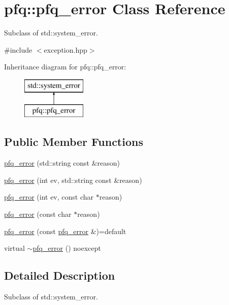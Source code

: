 \hypertarget{classpfq_1_1pfq__error}{}\section{pfq\+:\+:pfq\+\_\+error Class Reference}
\label{classpfq_1_1pfq__error}


Subclass of std\+::system\+\_\+error.  




{\ttfamily \#include $<$exception.\+hpp$>$}

Inheritance diagram for pfq\+:\+:pfq\+\_\+error\+:\begin{figure}[H]
\begin{center}
\leavevmode
\includegraphics[height=2.000000cm]{classpfq_1_1pfq__error}
\end{center}
\end{figure}
\subsection*{Public Member Functions}
\begin{DoxyCompactItemize}
\item 
\hyperlink{classpfq_1_1pfq__error_af30cff741114b46fd4c50cef987d3ac4}{pfq\+\_\+error} (std\+::string const \&reason)
\item 
\hyperlink{classpfq_1_1pfq__error_ad11ae06da6b581f49d40081d51ae4a6b}{pfq\+\_\+error} (int ev, std\+::string const \&reason)
\item 
\hyperlink{classpfq_1_1pfq__error_a200dca27eee04a6da834364b9342a81d}{pfq\+\_\+error} (int ev, const char $\ast$reason)
\item 
\hyperlink{classpfq_1_1pfq__error_a5af35c9d9dea6aceff0672b92ad6b844}{pfq\+\_\+error} (const char $\ast$reason)
\item 
\hyperlink{classpfq_1_1pfq__error_a64f033ecc5b20bd22872fee3f22fd499}{pfq\+\_\+error} (const \hyperlink{classpfq_1_1pfq__error}{pfq\+\_\+error} \&)=default
\item 
virtual \hyperlink{classpfq_1_1pfq__error_a0aeb73a633e889817967897ef28b3512}{$\sim$pfq\+\_\+error} () noexcept
\end{DoxyCompactItemize}


\subsection{Detailed Description}
Subclass of std\+::system\+\_\+error. 

